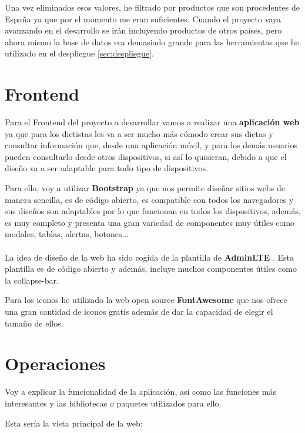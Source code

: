 Una vez eliminados esos valores, he filtrado por productos que son procedentes de España ya que por el momento me eran suficientes.
Cuando el proyecto vaya avanzando en el desarrollo se irán incluyendo productos de otros países, pero ahora mismo la base de datos era
 demasiado grande para las herramientas que he utilizado en el despliegue \ref{sec:despliegue}.\\

\section{Frontend} \label{sec:frontend}

Para el Frontend del proyecto a desarrollar vamos a realizar una \textbf{aplicación web} ya que para los dietistas les va a ser mucho más cómodo
crear sus dietas y consultar información que, desde una aplicación móvil, y para los demás usuarios pueden consultarlo desde otros dispositivos, si así lo quisieran, 
debido a que el diseño va a ser adaptable para todo tipo de dispositivos.

Para ello, voy a utilizar \textbf{Bootstrap} \cite{bootstrap} ya que nos permite diseñar sitios webs de manera sencilla,
es de código abierto, es compatible con todos los navegadores y sus diseños son adaptables por lo que funcionan en todos los dispositivos,
además, es muy completo y presenta una gran variedad de componentes muy útiles como modales, tablas, alertas, botones...\\ \\

La idea de diseño de la web ha sido cogida de la plantilla de \textbf{AdminLTE} \cite{adminlte}. Esta plantilla es de código abierto y 
además, incluye muchos componentes útiles como la collapse-bar.

Para los iconos he utilizado la web open source \textbf{FontAwesome} \cite{iconos} que nos 
ofrece una gran cantidad de iconos gratis además de dar la capacidad de elegir el tamaño de ellos.

\section{Operaciones} \label{sec:backend}

Voy a explicar la funcionalidad de la aplicación, así como las funciones más interesantes y las bibliotecas o paquetes utilizados para ello.

Esta sería la vista principal de la web:

